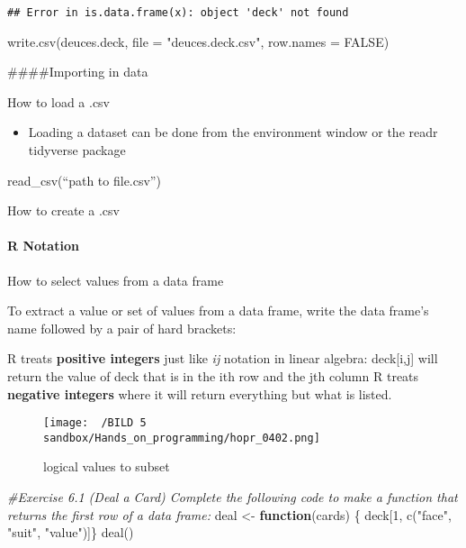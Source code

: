\documentclass[
]{article}
\newenvironment{Shaded}{\begin{snugshade}}{\end{snugshade}}
\newcommand{\AttributeTok}[1]{\textcolor[rgb]{0.77,0.63,0.00}{#1}}
\newcommand{\CommentTok}[1]{\textcolor[rgb]{0.56,0.35,0.01}{\textit{#1}}}
\newcommand{\ConstantTok}[1]{\textcolor[rgb]{0.00,0.00,0.00}{#1}}
\newcommand{\ControlFlowTok}[1]{\textcolor[rgb]{0.13,0.29,0.53}{\textbf{#1}}}
\newcommand{\DecValTok}[1]{\textcolor[rgb]{0.00,0.00,0.81}{#1}}
\newcommand{\FunctionTok}[1]{\textcolor[rgb]{0.00,0.00,0.00}{#1}}
\newcommand{\NormalTok}[1]{#1}
\newcommand{\OtherTok}[1]{\textcolor[rgb]{0.56,0.35,0.01}{#1}}
\newcommand{\StringTok}[1]{\textcolor[rgb]{0.31,0.60,0.02}{#1}}
\providecommand{\tightlist}{%
  \setlength{\itemsep}{0pt}\setlength{\parskip}{0pt}}
\begin{document}
\begin{verbatim}
## Error in is.data.frame(x): object 'deck' not found
\end{verbatim}

\begin{Shaded}
\begin{Highlighting}[]
\FunctionTok{write.csv}\NormalTok{(deuces.deck, }\AttributeTok{file =} \StringTok{"deuces.deck.csv"}\NormalTok{, }\AttributeTok{row.names =} \ConstantTok{FALSE}\NormalTok{)}
\end{Highlighting}
\end{Shaded}

\#\#\#\#Importing in data

How to load a .csv

\begin{itemize}
\tightlist
\item
  Loading a dataset can be done from the environment window or the readr
  tidyverse package
\end{itemize}

read\_csv(``path to file.csv'')

How to create a .csv

\hypertarget{r-notation}{%
\paragraph{R Notation}\label{r-notation}}

How to select values from a data frame

To extract a value or set of values from a data frame, write the data
frame's name followed by a pair of hard brackets:

R treats \textbf{positive integers} just like \emph{ij} notation in
linear algebra: deck{[}i,j{]} will return the value of deck that is in
the ith row and the jth column R treats \textbf{negative integers} where
it will return everything but what is listed.

\begin{figure}
\centering
\texttt{[image: ~/BILD 5 sandbox/Hands\_on\_programming/hopr\_0402.png]}
\caption{logical values to subset}
\end{figure}

\begin{Shaded}
\begin{Highlighting}[]
\CommentTok{\#Exercise 6.1 (Deal a Card) Complete the following code to make a function that returns the first row of a data frame:}
\NormalTok{deal }\OtherTok{\textless{}{-}} \ControlFlowTok{function}\NormalTok{(cards) \{}
\NormalTok{  deck[}\DecValTok{1}\NormalTok{, }\FunctionTok{c}\NormalTok{(}\StringTok{"face"}\NormalTok{, }\StringTok{"suit"}\NormalTok{, }\StringTok{"value"}\NormalTok{)]\}}
\FunctionTok{deal}\NormalTok{()}
\end{Highlighting}
\end{Shaded}
\end{document}

